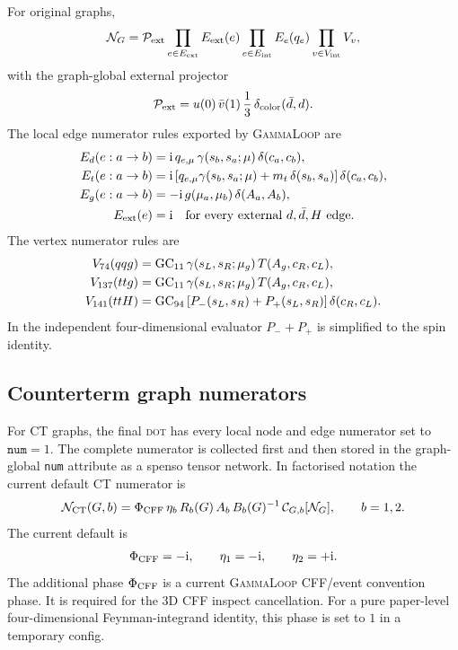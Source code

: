 \documentclass[11pt]{article}
\newcommand{\ii}{\mathrm{i}}
\newcommand{\GammaLoop}{\textsc{GammaLoop}}
\newcommand{\DOT}{\textsc{dot}}
\newcommand{\N}{\mathcal{N}}
\newcommand{\MT}{m_t}
\begin{document}
For original graphs,
\begin{equation}
  \N_G =
  {\cal P}_{\rm ext}
  \prod_{e\in E_{\rm ext}}E_{\rm ext}(e)
  \prod_{e\in E_{\rm int}}E_e(q_e)
  \prod_{v\in V_{\rm int}}V_v ,
  \label{eq:originalNumeratorProduct}
\end{equation}
with the graph-global external projector
\[
  {\cal P}_{\rm ext}
  =
  u(0)\,\bar v(1)\,\frac{1}{3}\,\delta_{\rm color}(\bar d,d).
\]
The local edge numerator rules exported by \GammaLoop{} are
\begin{align}
  E_d(e:a\to b)
  &=
  \ii\,q_{e,\mu}\,
  \gamma(s_b,s_a;\mu)\,
  \delta(c_a,c_b),
  \\
  E_t(e:a\to b)
  &=
  \ii\,[q_{e,\mu}\gamma(s_b,s_a;\mu)+\MT\,\delta(s_b,s_a)]
  \,\delta(c_a,c_b),
  \\
  E_g(e:a\to b)
  &=
  -\ii\,g(\mu_a,\mu_b)\,\delta(A_a,A_b),
  \\
  E_{\rm ext}(e)&=\ii
  \quad\hbox{for every external \(d,\bar d,H\) edge}.
\end{align}
The vertex numerator rules are
\begin{align}
  V_{74}(q q g)
  &=
  {\rm GC}_{11}\,\gamma(s_L,s_R;\mu_g)\,
  T(A_g,c_R,c_L),
  \\
  V_{137}(t t g)
  &=
  {\rm GC}_{11}\,\gamma(s_L,s_R;\mu_g)\,
  T(A_g,c_R,c_L),
  \\
  V_{141}(t t H)
  &=
  {\rm GC}_{94}\,[P_-(s_L,s_R)+P_+(s_L,s_R)]\,\delta(c_R,c_L).
\end{align}
In the independent four-dimensional evaluator \(P_-+P_+\) is simplified to
the spin identity.

\subsection{Counterterm graph numerators}

For CT graphs, the final \DOT{} has every local node and edge numerator set to
\(\texttt{num}=1\).  The complete numerator is collected first and then stored
in the graph-global \texttt{num} attribute as a spenso tensor network.  In
factorised notation the current default CT numerator is
\begin{equation}
  \N_{{\rm CT}}(G,b)
  =
  \Phi_{\rm CFF}\,\eta_b\,R_b(G)\,A_b\,B_b(G)^{-1}\,
  {\cal C}_{G,b}[\N_G],
  \qquad b=1,2.
  \label{eq:ctNumerator}
\end{equation}
The current default is
\[
  \Phi_{\rm CFF}=-\ii,\qquad
  \eta_1=-\ii,\qquad
  \eta_2=+\ii.
\]
The additional phase \(\Phi_{\rm CFF}\) is a current \GammaLoop{} CFF/event
convention phase.  It is required for the 3D CFF inspect cancellation.  For a
pure paper-level four-dimensional Feynman-integrand identity, this phase is
set to \(1\) in a temporary config.
\end{document}
